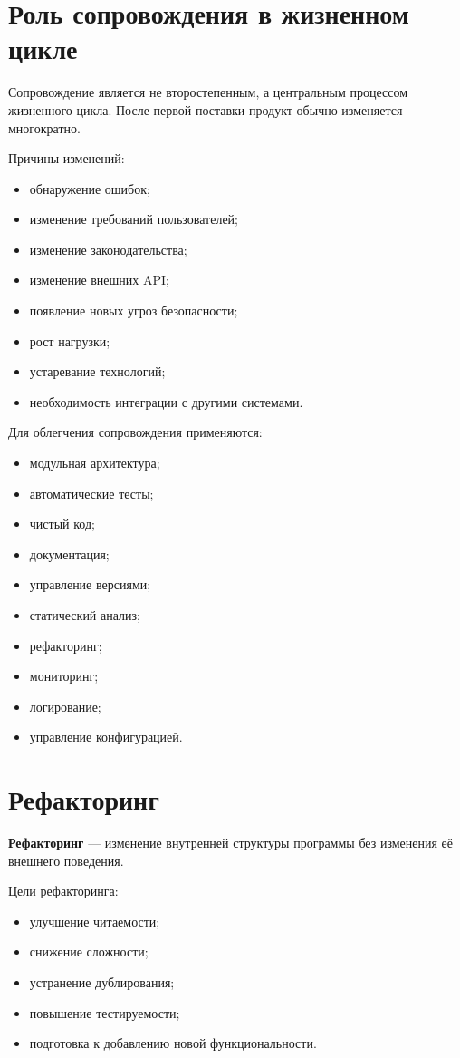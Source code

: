 \documentclass[12pt,a4paper]{article}
\begin{document}
\section{Роль сопровождения в жизненном цикле}

Сопровождение является не второстепенным, а центральным процессом жизненного цикла. После первой поставки продукт обычно изменяется многократно.

Причины изменений:
\begin{itemize}
    \item обнаружение ошибок;
    \item изменение требований пользователей;
    \item изменение законодательства;
    \item изменение внешних API;
    \item появление новых угроз безопасности;
    \item рост нагрузки;
    \item устаревание технологий;
    \item необходимость интеграции с другими системами.
\end{itemize}

Для облегчения сопровождения применяются:
\begin{itemize}
    \item модульная архитектура;
    \item автоматические тесты;
    \item чистый код;
    \item документация;
    \item управление версиями;
    \item статический анализ;
    \item рефакторинг;
    \item мониторинг;
    \item логирование;
    \item управление конфигурацией.
\end{itemize}

\section{Рефакторинг}

\textbf{Рефакторинг} --- изменение внутренней структуры программы без изменения её внешнего поведения.

Цели рефакторинга:
\begin{itemize}
    \item улучшение читаемости;
    \item снижение сложности;
    \item устранение дублирования;
    \item повышение тестируемости;
    \item подготовка к добавлению новой функциональности.
\end{itemize}
\end{document}
